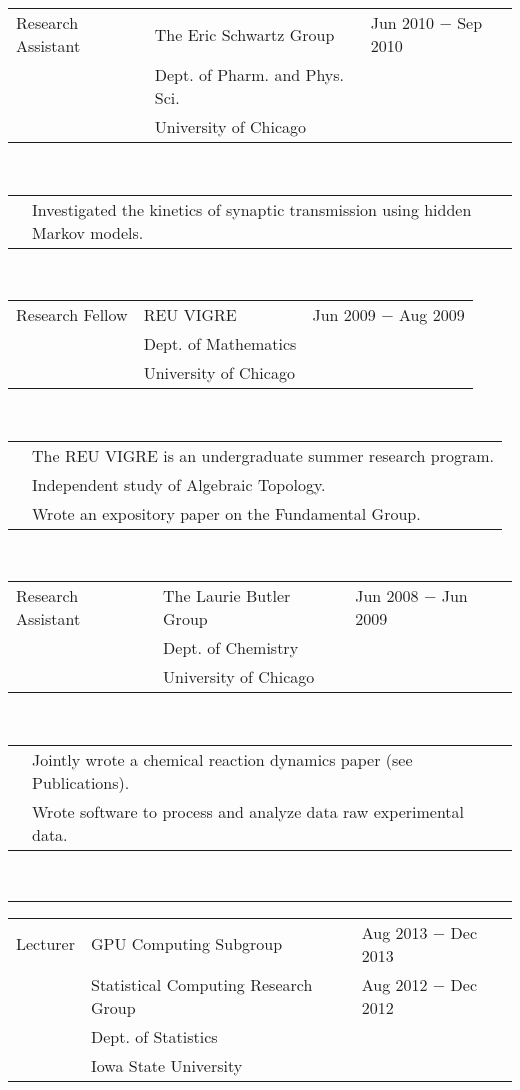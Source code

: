 \documentclass{article}
\newcommand{\q}{$\quad$ \newline}
\newcommand{\vl}{4.25}
\newcommand{\wl}{8.4}
\newcommand{\ww}{13}
\newcommand{\myrule}{\noindent \rule{\textwidth}{1pt}}
\begin{document}
\noindent \begin{tabular}{@{}p{\vl cm}p{\wl cm}l@{}}
Research Assistant & The Eric Schwartz Group & Jun 2010 $-$ Sep 2010  \\ 
 &Dept. of Pharm. and Phys. Sci.&  \\ 
 &University of Chicago &
\end{tabular} \q \q

\noindent \begin{tabular}{@{}p{\vl cm}p{\ww cm}@{}}
&Investigated the kinetics of synaptic transmission using hidden Markov models.
\end{tabular} \q \q

\noindent \begin{tabular}{@{}p{\vl cm}p{\wl cm}l@{}}
Research Fellow & REU VIGRE & Jun 2009 $-$ Aug 2009  \\ 
 &Dept. of Mathematics &  \\ 
 &University of Chicago & 
\end{tabular} \q \q

\noindent \begin{tabular}{@{}p{\vl cm}p{\ww cm}@{}}
& The REU VIGRE is an undergraduate summer research program. \\
& Independent study of Algebraic Topology. \\
& Wrote an expository paper on the Fundamental Group.
\end{tabular} \q \q

\noindent \begin{tabular}{@{}p{\vl cm}p{\wl cm}l@{}}
Research Assistant & The Laurie Butler Group & Jun 2008 $-$ Jun 2009  \\ 
 &Dept. of Chemistry &  \\ 
 &University of Chicago &
\end{tabular} \q \q

\noindent \begin{tabular}{@{}p{\vl cm}p{\ww cm}@{}}
& Jointly wrote a chemical reaction dynamics paper (see Publications). \\
& Wrote software to process and analyze data raw experimental data.
\end{tabular} \q \q \q


\myrule
 
\noindent \begin{tabular}{@{}p{\vl cm}p{\wl cm}l@{}}
Lecturer & GPU Computing Subgroup & Aug 2013 $-$ Dec 2013 \\
& Statistical Computing Research Group & Aug 2012 $-$ Dec 2012 \\
& Dept. of Statistics & \\
& Iowa State University & 
\end{tabular} \q \q
   
\end{document}

